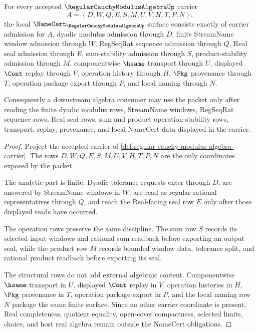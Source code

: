 \begin{theorem}
\label{thm:regular-cauchy-modulus-algebra-namecert-obligations}
For every accepted $\RegularCauchyModulusAlgebraUp$ carrier
$$
A=(D,W,Q,E,S,M,U,V,H,T,P,N),
$$
the local $\NameCert_{\RegularCauchyModulusAlgebraUp}$ surface consists exactly of carrier admission for $A$, dyadic modulus admission through $D$, finite StreamName window admission through $W$, RegSeqRat sequence admission through $Q$, Real seal admission through $E$, sum-stability admission through $S$, product-stability admission through $M$, componentwise $\hsame$ transport through $U$, displayed $\Cont$ replay through $V$, operation history through $H$, $\Pkg$ provenance through $T$, operation package export through $P$, and local naming through $N$.

Consequently a downstream algebra consumer may use the packet only after reading the finite dyadic modulus rows, StreamName windows, RegSeqRat sequence rows, Real seal rows, sum and product operation-stability rows, transport, replay, provenance, and local NameCert data displayed in the carrier.
\end{theorem}
\begin{proof}
Project the accepted carrier of \autoref{def:regular-cauchy-modulus-algebra-carrier}. The rows $D,W,Q,E,S,M,U,V,H,T,P,N$ are the only coordinates exposed by the packet.

The analytic part is finite. Dyadic tolerance requests enter through $D$, are answered by StreamName windows in $W$, are read as regular rational representatives through $Q$, and reach the Real-facing seal row $E$ only after those displayed reads have occurred.

The operation rows preserve the same discipline. The sum row $S$ records its selected input windows and rational sum readback before exporting an output seal, while the product row $M$ records bounded window data, tolerance split, and rational product readback before exporting its seal.

The structural rows do not add external algebraic content. Componentwise $\hsame$ transport in $U$, displayed $\Cont$ replay in $V$, operation histories in $H$, $\Pkg$ provenance in $T$, operation package export in $P$, and the local naming row $N$ package the same finite surface. Since no other carrier coordinate is present, Real completeness, quotient equality, open-cover compactness, selected limits, choice, and host real algebra remain outside the NameCert obligations.
\end{proof}

